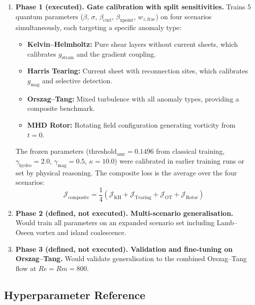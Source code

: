 \documentclass[12pt, a4paper, oneside]{report}
\begin{document}
\begin{enumerate}
    \item \textbf{Phase 1 (executed). Gate calibration with split sensitivities.} Trains 5 quantum parameters ($\beta$, $\sigma$, $\beta_{\text{curl}}$, $\beta_{\text{xpoint}}$, $w_{z,\text{frac}}$) on four scenarios simultaneously, each targeting a specific anomaly type:
    \begin{itemize}
        \item \textbf{Kelvin--Helmholtz:} Pure shear layers without current sheets, which calibrates $g_{\text{strain}}$ and the gradient coupling.
        \item \textbf{Harris Tearing:} Current sheet with reconnection sites, which calibrates $g_{\text{mag}}$ and selective detection.
        \item \textbf{Orszag--Tang:} Mixed turbulence with all anomaly types, providing a composite benchmark.
        \item \textbf{MHD Rotor:} Rotating field configuration generating vorticity from $t = 0$.
    \end{itemize}
    The frozen parameters ($\text{threshold}_{\text{amr}} = 0.1496$ from classical training, $\gamma_{\text{hydro}} = 2.0$, $\gamma_{\text{mag}} = 0.5$, $\kappa = 10.0$) were calibrated in earlier training runs or set by physical reasoning. The composite loss is the average over the four scenarios:
    \begin{equation}
        \mathcal{J}_{\text{composite}} = \frac{1}{4}\left(\mathcal{J}_{\text{KH}} + \mathcal{J}_{\text{Tearing}} + \mathcal{J}_{\text{OT}} + \mathcal{J}_{\text{Rotor}}\right)
    \end{equation}

    \item \textbf{Phase 2 (defined, not executed). Multi-scenario generalisation.} Would train all parameters on an expanded scenario set including Lamb--Oseen vortex and island coalescence.

    \item \textbf{Phase 3 (defined, not executed). Validation and fine-tuning on Orszag--Tang.} Would validate generalisation to the combined Orszag--Tang flow at $Re = Rm = 800$.
\end{enumerate}

\subsection{Hyperparameter Reference}
\end{document}

